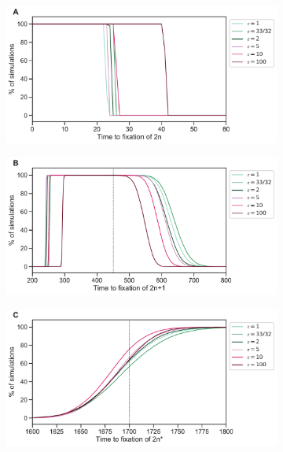 \documentclass[12pt]{extarticle}
\begin{document}
\begin{figure}[p]
  \centering
  \begin{subfigure}{0.75\textwidth}
      \includegraphics[width=\textwidth]{../figures/tau-diff-a.pdf}      
  \end{subfigure}
  \begin{subfigure}{0.75\textwidth}
      \includegraphics[width=\textwidth]{../figures/tau-diff-b.pdf}      
  \end{subfigure}
   \begin{subfigure}{0.75\textwidth}
      \includegraphics[width=\textwidth]{../figures/tau-diff-c.pdf}      

\end{subfigure}
\end{figure}
\end{document}
